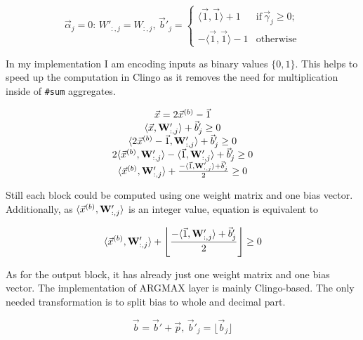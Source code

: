 \documentclass[
    digital,
    color,
    oneside,
    sansbold,
    lot,
    nolof
]{fithesis}
\begin{document}
\begin{equation*}
    \vec \alpha_j = 0:\, W'_{:,j} = W_{:,j},\, \vec b'_j = \left\{
        \begin{matrix}
            \langle\vec 1, \vec 1\rangle + 1 & \mathrm{if}\, \vec\gamma_j \geq 0;\\
            -\langle\vec 1, \vec 1\rangle - 1 & \mathrm{otherwise}
        \end{matrix}
    \right.
\end{equation*}

In my implementation I am encoding inputs as binary values $\{0, 1\}$.
This helps to speed up the computation in Clingo as it
removes the need for multiplication inside of {\tt\#sum} aggregates.

\begin{equation*}
    \begin{matrix}
        \vec x = 2 \vec x^{(b)} - \vec1\\
        \langle \vec x, \mathbf{W}'_{:, j}\rangle + \vec b'_j \geq 0\\
        \langle 2\vec x^{(b)} - \vec1, \mathbf{W}'_{:, j}\rangle + \vec b'_j \geq 0\\
        2\langle \vec x^{(b)}, \mathbf{W}'_{:, j}\rangle - \langle\vec1, \mathbf{W}'_{:,j}\rangle + \vec b'_j \geq 0\\
        \langle \vec x^{(b)}, \mathbf{W}'_{:, j}\rangle + \frac{- \langle\vec1, \mathbf{W}'_{:,j}\rangle + \vec b'_j}{2} \geq 0\\
    \end{matrix}
\end{equation*}

Still each block could be computed using one weight matrix and one bias vector.
Additionally, as $\langle\vec x^{(b)}, \mathbf{W}'_{:, j}\rangle$ is an integer value,
equation is equivalent to

\begin{equation}
    \langle \vec x^{(b)}, \mathbf{W}'_{:, j}\rangle + \left\lfloor \frac{- \langle\vec1, \mathbf{W}'_{:,j}\rangle + \vec b'_j}{2} \right\rfloor \geq 0\\
    \label{eq:layer_comp}
\end{equation}

As for the output block, it has already just one weight matrix and one bias
vector. The implementation of ARGMAX layer is mainly Clingo-based.
The only needed transformation is to split bias to whole and decimal part.

\begin{equation*}
    \vec b = \vec b' + \vec p, \, \vec b'_j = \lfloor \vec b_j \rfloor
\end{equation*}
\end{document}
